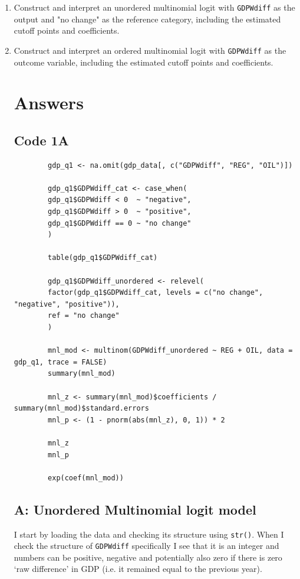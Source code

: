 \documentclass[12pt,letterpaper]{article}
\begin{document}
\begin{enumerate}
	\item Construct and interpret an unordered multinomial logit with \texttt{GDPWdiff} as the output and "no change" as the reference category, including the estimated cutoff points and coefficients.
	\item Construct and interpret an ordered multinomial logit with \texttt{GDPWdiff} as the outcome variable, including the estimated cutoff points and coefficients. \newpage
	
	\section{Answers}
	\subsection{Code 1A}
	
	\tiny \begin{BVerbatim}
		gdp_q1 <- na.omit(gdp_data[, c("GDPWdiff", "REG", "OIL")])
		
		gdp_q1$GDPWdiff_cat <- case_when(
		gdp_q1$GDPWdiff < 0  ~ "negative",
		gdp_q1$GDPWdiff > 0  ~ "positive",
		gdp_q1$GDPWdiff == 0 ~ "no change"
		)
		
		table(gdp_q1$GDPWdiff_cat)
		
		gdp_q1$GDPWdiff_unordered <- relevel(
		factor(gdp_q1$GDPWdiff_cat, levels = c("no change", "negative", "positive")),
		ref = "no change"
		)
		
		mnl_mod <- multinom(GDPWdiff_unordered ~ REG + OIL, data = gdp_q1, trace = FALSE)
		summary(mnl_mod)
		
		mnl_z <- summary(mnl_mod)$coefficients / summary(mnl_mod)$standard.errors
		mnl_p <- (1 - pnorm(abs(mnl_z), 0, 1)) * 2
		
		mnl_z
		mnl_p
		
		exp(coef(mnl_mod))

	\end{BVerbatim}
	\normalsize
	
	\subsection{A: Unordered Multinomial logit model}
	\noindent I start by loading the data and checking its structure using \texttt{str()}. When I check the structure of \texttt{GDPWdiff} specifically I see that it is an integer and numbers can be positive, negative and potentially also zero if there is zero `raw difference' in GDP (i.e. it remained equal to the previous year).\newline
	

\end{enumerate}
\end{document}
